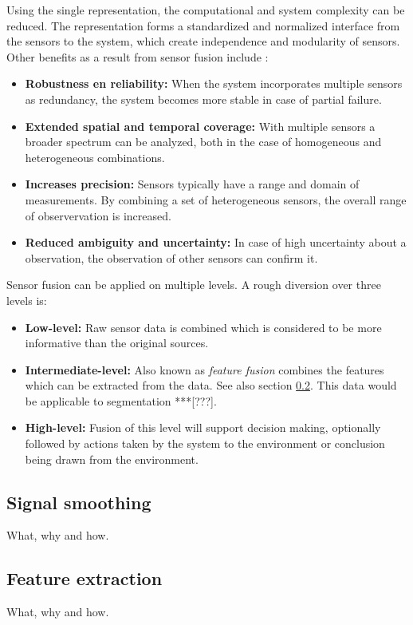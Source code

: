     Using the single representation, the computational and system complexity can be reduced.
    The representation forms a standardized and normalized interface from the sensors to the system, which create independence and modularity of sensors.
    Other benefits as a result from sensor fusion include \cite{elmenreich2001introduction}:
    \begin{itemize}
      \item \textbf{Robustness en reliability:} When the system incorporates multiple sensors as redundancy, the system becomes more stable in case of partial failure.
      \item \textbf{Extended spatial and temporal coverage:} With multiple sensors a broader spectrum can be analyzed, both in the case of homogeneous and heterogeneous combinations.
      \item \textbf{Increases precision:} Sensors typically have a range and domain of measurements.
      By combining a set of heterogeneous sensors, the overall range of observervation is increased.
      \item \textbf{Reduced ambiguity and uncertainty:} In case of high uncertainty about a observation, the observation of other sensors can confirm it.
    \end{itemize}

    Sensor fusion can be applied on multiple levels. A rough diversion over three levels is:
    \begin{itemize}
      \item \textbf{Low-level:} Raw sensor data is combined which is considered to be more informative than the original sources.
      \item \textbf{Intermediate-level:} Also known as \emph{feature fusion} combines the features which can be extracted from the data.
      See also section \ref{sec:feature_extraction}.
      This data would be applicable to segmentation ***[???].
      \item \textbf{High-level:} Fusion of this level will support decision making, optionally followed by actions taken by the system to the environment or conclusion being drawn from the environment.
    \end{itemize}


    \subsection{Signal smoothing}
    What, why and how.

    \subsection{Feature extraction}
    \label{sec:feature_extraction}
    What, why and how.